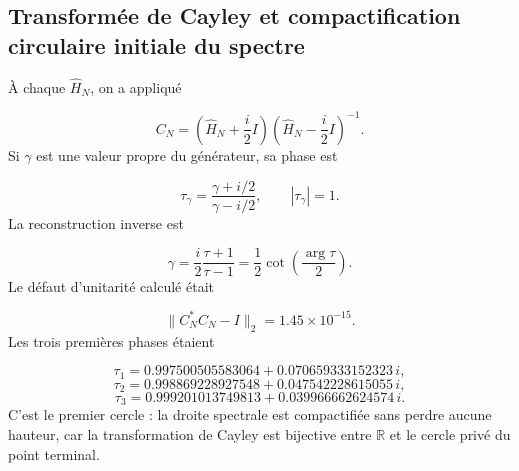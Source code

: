 \subsection{Transformée de Cayley et compactification circulaire initiale du spectre}
À chaque \(\widehat H_N\), on a appliqué\par
\[
C_N=
\left(\widehat H_N+\frac{i}{2}I\right)
\left(\widehat H_N-\frac{i}{2}I\right)^{-1}.
\]
Si \(\gamma\) est une valeur propre du générateur, sa phase est\par
\[
\tau_\gamma
=
\frac{\gamma+i/2}{\gamma-i/2},
\qquad |\tau_\gamma|=1.
\]
La reconstruction inverse est\par
\[
\gamma
=
\frac{i}{2}\frac{\tau+1}{\tau-1}
=
\frac12\cot\!\left(\frac{\arg\tau}{2}\right).
\]
Le défaut d'unitarité calculé était\par
\[
\|C_N^*C_N-I\|_2=1.45\times10^{-15}.
\]
Les trois premières phases étaient\par
\[
\tau_1=
0.997500505583064
+0.070659333152323\,i,
\]
\[
\tau_2=
0.998869228927548
+0.047542228615055\,i,
\]
\[
\tau_3=
0.999201013749813
+0.039966662624574\,i.
\]
C'est le premier cercle : la droite spectrale est compactifiée sans perdre aucune hauteur, car la transformation de Cayley est bijective entre \(\mathbb R\) et le cercle privé du point terminal.\par
{}
